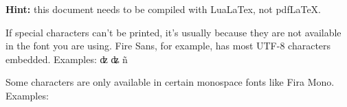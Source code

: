 \documentclass{article}
\begin{document}
\textbf{Hint:} this document needs to be compiled with LuaLaTex, not pdfLaTeX.

If special characters can't be printed, it's usually because they are not
available in the font you are using. Fire Sans, for example, has most UTF-8
characters embedded. Examples: ʣ ʥ ñ

Some characters are only available in certain monospace
fonts like Fira Mono. Examples: 
\end{document}
